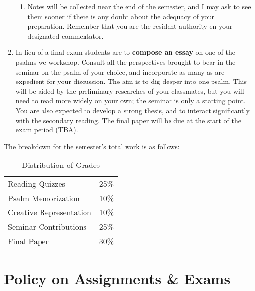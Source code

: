 \documentclass[titlepage]{article}
\newcommand\policy{../policy}
\begin{document}
\begin{enumerate}
\begin{enumerate}
    \item Notes will be collected near the end of the semester, and I may
       ask to see them sooner if there is any doubt about the adequacy of
       your preparation. Remember that you are the resident authority on
       your designated commentator.

	\end{enumerate}

  \item In lieu of a final exam students are to \textbf{compose an essay}
	   on one of the psalms we workshop. Consult all the perspectives
	   brought to bear in the seminar on the psalm of your choice, and
	   incorporate as many as are expedient for your discussion. The aim
	   is to dig deeper into one psalm. This will be aided by the
	   preliminary researches of your classmates, but you will need to
	   read more widely on your own; the seminar is only a starting
	   point. You are also expected to develop a strong thesis, and to
	   interact significantly with the secondary reading. The final
	   paper will be due at the start of the exam period (TBA).

\end{enumerate}

The breakdown for the semester's total work is as follows:

\begin{table}[htbp]
  \centering
  {\lining
  \begin{tabular}{lr}
    \toprule
    Reading Quizzes         & 25\% \\
    Psalm Memorization      & 10\% \\
    Creative Representation & 10\% \\
    Seminar Contributions   & 25\% \\
    Final Paper             & 30\% \\
    \bottomrule
  \end{tabular}}
  \caption{Distribution of Grades}
  \label{distribution}
\end{table}



\section{Policy on Assignments \& Exams}
\label{policy}



%
\end{document}

